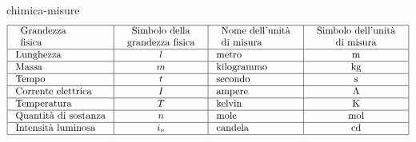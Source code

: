 \documentclass[preview]{standalone}
\begin{document}
\begin{snippet}{chimica-misure}
    \phantom{}$$
    \begin{array}{|l|c|l|c|}
    \hline \begin{array}{l}
    \text { Grandezza } \\
    \text { fisica }
    \end{array} & \begin{array}{c}
    \text { Simbolo della } \\
    \text { grandezza fisica }
    \end{array} & \begin{array}{l}
    \text { Nome dell'unità } \\
    \text { di misura }
    \end{array} & \begin{array}{c}
    \text { Simbolo dell'unità } \\
    \text { di misura }
    \end{array} \\
    \hline \text { Lunghezza } & l & \text { metro } & \mathrm{m} \\
    \hline \text { Massa } & m & \text { kilogrammo } & \mathrm{kg} \\
    \hline \text { Tempo } & t & \text { secondo } & \mathrm{s} \\
    \hline \text { Corrente elettrica } & I & \text { ampere } & \mathrm{A} \\
    \hline \text { Temperatura } & T & \text { kelvin } & \mathrm{K} \\
    \hline \text { Quantità di sostanza } & n & \text { mole } & \mathrm{mol} \\
    \hline \text { Intensità luminosa } & i_v & \text { candela } & \mathrm{cd} \\
    \hline
    \end{array}
    $$
\end{snippet}
\end{document}
